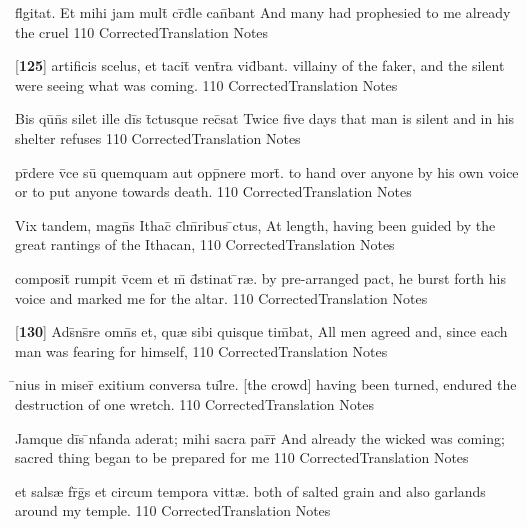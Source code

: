 \latline
  {fl\={}gitat.  Et mihi jam mult\={\macron {\i}} cr\={}d\={}le can\={}bant}
  { And many had prophesied to me already the cruel   }
  {110}
  { CorrectedTranslation }
  { Notes }


\latline
  {[\textbf{125}] artificis scelus, et tacit\={\macron {\i}} vent\={}ra vid\={}bant.}
  { villainy of the faker, and the silent were seeing what was coming. }
  {110}
  { CorrectedTranslation }
  { Notes }


\latline
  {Bis qu\={\macron {\i}}n\={}s silet ille di\={}s t\={}ctusque rec\={}sat}
  { Twice five days that man is silent and in his shelter refuses  }
  {110}
  { CorrectedTranslation }
  { Notes }


\latline
  {pr\={}dere v\={}ce su\={} quemquam aut opp\={}nere mort\={\macron {\i}}.}
  { to hand over anyone by his own voice or to put anyone towards death. }
  {110}
  { CorrectedTranslation }
  { Notes }


\latline
  {Vix tandem, magn\={\macron {\i}}s Ithac\={\macron {\i}} cl\={}m\={}ribus \={}ctus,}
  { At length, having been guided by the great rantings of the Ithacan, }
  {110}
  { CorrectedTranslation }
  { Notes }


\latline
  {composit\={} rumpit v\={}cem et m\={} d\={}stinat \={}r{\ae}.}
  { by pre-arranged pact, he burst forth his voice and marked me for the altar.  }
  {110}
  { CorrectedTranslation }
  { Notes }


\latline
  {[\textbf{130}] Ads\={}ns\={}re omn\={}s et, qu{\ae} sibi quisque tim\={}bat,}
  { All men agreed and, since each man was fearing for himself, }
  {110}
  { CorrectedTranslation }
  { Notes }


\latline
  {\={}nius in miser\={\macron {\i}} exitium conversa tul\={}re.}
  { [the crowd] having been turned, endured the destruction of one wretch. }
  {110}
  { CorrectedTranslation }
  { Notes }


\latline
  {Jamque di\={}s \={\macron {\i}}nfanda aderat; mihi sacra par\={}r\={\macron {\i}} }
  { And already the wicked was coming; sacred thing began to be prepared for me }
  {110}
  { CorrectedTranslation }
  { Notes }


\latline
  {et sals{\ae} fr\={}g\={}s et circum tempora vitt{\ae}.}
  { both of salted grain and also garlands around my temple. }
  {110}
  { CorrectedTranslation }
  { Notes }


